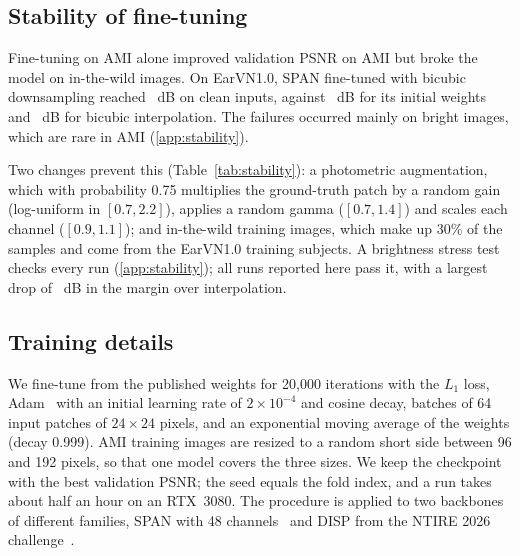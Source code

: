 \subsection{Stability of fine-tuning}
\label{sec:stable}
Fine-tuning on AMI alone improved validation PSNR on AMI but broke the model on in-the-wild images. On EarVN1.0, SPAN fine-tuned with bicubic downsampling reached \CollapsePsnr{}~dB on clean inputs, against \CollapsePub{}~dB for its initial weights and \CollapseBic{}~dB for bicubic interpolation. The failures occurred mainly on bright images, which are rare in AMI (\ref{app:stability}).

Two changes prevent this (Table~\ref{tab:stability}): a photometric augmentation, which with probability 0.75 multiplies the ground-truth patch by a random gain (log-uniform in $[0.7, 2.2]$), applies a random gamma ($[0.7,1.4]$) and scales each channel ($[0.9,1.1]$); and in-the-wild training images, which make up 30\% of the samples and come from the EarVN1.0 training subjects. A brightness stress test checks every run (\ref{app:stability}); all \NRuns{} runs reported here pass it, with a largest drop of \StressMaxDrop{}~dB in the margin over interpolation.

\subsection{Training details}
We fine-tune from the published weights for 20{,}000 iterations with the $L_1$ loss, Adam~\cite{kingma2015adam} with an initial learning rate of $2\times10^{-4}$ and cosine decay, batches of 64 input patches of $24\times24$ pixels, and an exponential moving average of the weights (decay 0.999). AMI training images are resized to a random short side between 96 and 192 pixels, so that one model covers the three sizes. We keep the checkpoint with the best validation PSNR; the seed equals the fold index, and a run takes about half an hour on an RTX~3080. The procedure is applied to two backbones of different families, SPAN with 48 channels~\cite{wan2024span} and DISP from the NTIRE 2026 challenge~\cite{ren2026ntire}.
